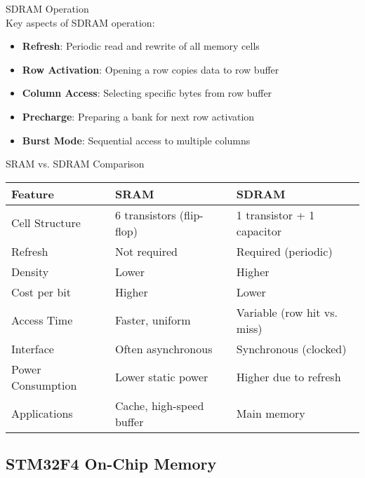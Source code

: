 \begin{definition}{SDRAM Operation}\\
Key aspects of SDRAM operation:
\begin{itemize}
    \item \textbf{Refresh}: Periodic read and rewrite of all memory cells
    \item \textbf{Row Activation}: Opening a row copies data to row buffer
    \item \textbf{Column Access}: Selecting specific bytes from row buffer
    \item \textbf{Precharge}: Preparing a bank for next row activation
    \item \textbf{Burst Mode}: Sequential access to multiple columns
\end{itemize}
\end{definition}

\begin{concept}{SRAM vs. SDRAM Comparison}
\begin{center}
\begin{tabular}{|p{3cm}|p{6cm}|p{6cm}|}
\hline
\textbf{Feature} & \textbf{SRAM} & \textbf{SDRAM} \\
\hline
Cell Structure & 6 transistors (flip-flop) & 1 transistor + 1 capacitor \\
\hline
Refresh & Not required & Required (periodic) \\
\hline
Density & Lower & Higher \\
\hline
Cost per bit & Higher & Lower \\
\hline
Access Time & Faster, uniform & Variable (row hit vs. miss) \\
\hline
Interface & Often asynchronous & Synchronous (clocked) \\
\hline
Power Consumption & Lower static power & Higher due to refresh \\
\hline
Applications & Cache, high-speed buffer & Main memory \\
\hline
\end{tabular}
\end{center}
\end{concept}

\subsection{STM32F4 On-Chip Memory}


